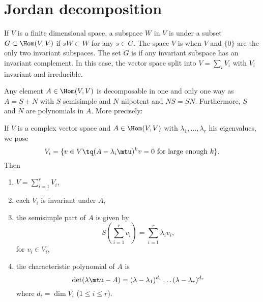 \section{Jordan decomposition}

If $V$ is a finite dimensional space, a subspace $W$ in $V$ is  under a subset $G\subset\Hom(V,V)$ if $sW\subset W$ for any $s\in G$. The space $V$ is  when $V$ and $\{0\}$ are the only two invariant subspaces. The set $G$ is  if any invariant subspace has an invariant complement. In this case, the vector space split into $V=\sum_iV_i$ with $V_i$ invariant and irreducible.

\begin{theorem}
Any element $A\in\Hom(V,V)$ is decomposable in one and only one way as $A=S+N$ with $S$ semisimple and $N$ nilpotent and $NS=SN$. Furthermore, $S$ and $N$ are polynomials in $A$. More precisely:

If $V$ is a complex vector space and $A\in\Hom(V,V)$ with $\lambda_1,\ldots,\lambda_r$ his eigenvalues, we pose
\[
V_i=\{ v\in V\tq (A-\lambda_i\mtu)^kv=0 \textrm{ for large enough $k$}\}.
\]
Then

\begin{enumerate}\label{tho:jordan}
\item $V=\sum_{i=1}^rV_i$,
\item each $V_i$ is invariant under $A$,
\item the semisimple part of $A$ is given by
\[
   S(\sum_{i=1}^rv_i)=\sum_{i=1}^r\lambda_iv_i,
\]
for $v_i\in V_i$,

\item the characteristic polynomial of $A$ is
\[
  \det(\lambda\mtu-A)=(\lambda-\lambda_1)^{d_1}\ldots(\lambda-\lambda_r)^{d_r}
\]
where $d_i=\dim V_i$ ($1\leq i\leq r$).
\end{enumerate}
\end{theorem}

